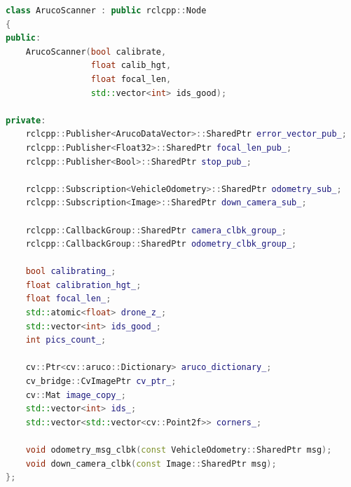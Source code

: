\begin{lstlisting}[language=C++, caption={Definizione del nodo \emph{aruco\_scanner}.}, label={lst:ascan}]
class ArucoScanner : public rclcpp::Node
{
public:
    ArucoScanner(bool calibrate,
                 float calib_hgt,
                 float focal_len,
                 std::vector<int> ids_good);

private:
    rclcpp::Publisher<ArucoDataVector>::SharedPtr error_vector_pub_;
    rclcpp::Publisher<Float32>::SharedPtr focal_len_pub_;
    rclcpp::Publisher<Bool>::SharedPtr stop_pub_;

    rclcpp::Subscription<VehicleOdometry>::SharedPtr odometry_sub_;
    rclcpp::Subscription<Image>::SharedPtr down_camera_sub_;

    rclcpp::CallbackGroup::SharedPtr camera_clbk_group_;
    rclcpp::CallbackGroup::SharedPtr odometry_clbk_group_;

    bool calibrating_;
    float calibration_hgt_;
    float focal_len_;
    std::atomic<float> drone_z_;
    std::vector<int> ids_good_;
    int pics_count_;

    cv::Ptr<cv::aruco::Dictionary> aruco_dictionary_;
    cv_bridge::CvImagePtr cv_ptr_;
    cv::Mat image_copy_;
    std::vector<int> ids_;
    std::vector<std::vector<cv::Point2f>> corners_;

    void odometry_msg_clbk(const VehicleOdometry::SharedPtr msg);
    void down_camera_clbk(const Image::SharedPtr msg);
};
\end{lstlisting}
\clearpage

